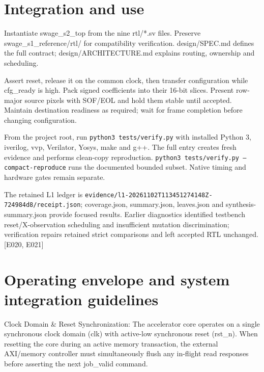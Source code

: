 \documentclass[11pt,a4paper]{article}
\begin{document}
\section{Integration and use}

Instantiate swage\_\allowbreak{}s2\_\allowbreak{}top from the nine rtl/\allowbreak{}*\allowbreak{}.sv files. Preserve swage\_\allowbreak{}s1\_\allowbreak{}reference/\allowbreak{}rtl/\allowbreak{} for compatibility verification. design/\allowbreak{}SPEC.md defines the full contract; design/\allowbreak{}ARCHITECTURE.md explains routing,\allowbreak{} ownership and scheduling.


Assert reset,\allowbreak{} release it on the common clock,\allowbreak{} then transfer configuration while cfg\_\allowbreak{}ready is high. Pack signed coefficients into their 16-bit slices. Present row-major source pixels with SOF/\allowbreak{}EOL and hold them stable until accepted. Maintain destination readiness as required; wait for frame completion before changing configuration.


From the project root,\allowbreak{} run \texttt{python3 tests/\allowbreak{}verify.py} with installed Python 3,\allowbreak{} iverilog,\allowbreak{} vvp,\allowbreak{} Verilator,\allowbreak{} Yosys,\allowbreak{} make and g+\allowbreak{}+\allowbreak{}. The full entry creates fresh evidence and performs clean-copy reproduction. \texttt{python3 tests/\allowbreak{}verify.py --compact-reproduce} runs the documented bounded subset. Native timing and hardware gates remain separate.


The retained L1 ledger is \texttt{evidence/\allowbreak{}l1-20261102T113451274148Z-724984d8/\allowbreak{}receipt.json}; coverage.json,\allowbreak{} summary.json,\allowbreak{} leaves.json and synthesis-summary.json provide focused results. Earlier diagnostics identified testbench reset/\allowbreak{}X-observation scheduling and insufficient mutation discrimination; verification repairs retained strict comparisons and left accepted RTL unchanged. [\allowbreak{}E020,\allowbreak{} E021]\allowbreak{}


\section{Operating envelope and system integration guidelines}

Clock Domain \& Reset Synchronization: The accelerator core operates on a single synchronous clock domain (\allowbreak{}clk)\allowbreak{} with active-low synchronous reset (\allowbreak{}rst\_\allowbreak{}n)\allowbreak{}. When resetting the core during an active memory transaction,\allowbreak{} the external AXI/\allowbreak{}memory controller must simultaneously flush any in-flight read responses before asserting the next job\_\allowbreak{}valid command.
\end{document}
